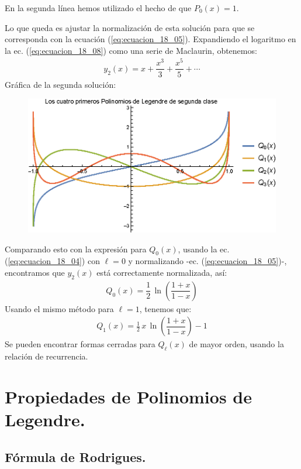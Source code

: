 \documentclass[12pt]{article}
\numberwithin{equation}{section}
\begin{document}
En la segunda línea hemos utilizado el hecho de que $P_{0} (x) = 1$.
\par
Lo que queda es ajustar la normalización de esta solución para que se corresponda con la ecuación (\ref{eq:ecuacion_18_05}). Expandiendo el logaritmo en la ec. (\ref{eq:ecuacion_18_08}) como una serie de Maclaurin, obtenemos:
\begin{align*}
y_{2} (x) = x + \dfrac{x^{3}}{3} + \dfrac{x^{5}}{5} + \cdots
\end{align*}
Gráfica de la segunda solución:
\begin{figure}[H]
    \centering
    \includegraphics[scale=0.9]{Imagenes/Plot_LagrangeSC_0-4.eps}
\end{figure}
Comparando esto con la expresión para $Q_{0} (x)$, usando la ec. (\ref{eq:ecuacion_18_04}) con $\ell = 0$ y normalizando -ec. (\ref{eq:ecuacion_18_05})-, encontramos que $y_{2} (x)$ está correctamente normalizada, así:
\begin{align*}
Q_{0} (x) = \dfrac{1}{2} \, \ln \left( \dfrac{1 + x}{1 - x} \right)
\end{align*}
Usando el mismo método para $\ell = 1$, tenemos que:
\begin{align*}
Q_{1} (x) =  \frac{1}{2} \, x \,  \ln \left( \dfrac{1 + x}{1 - x} \right) - 1
\end{align*}
Se pueden encontrar formas cerradas para $Q_{\ell} (x)$ de mayor orden, usando la relación de recurrencia.

\section{Propiedades de Polinomios de Legendre.}
\subsection{Fórmula de Rodrigues.}
\end{document}
